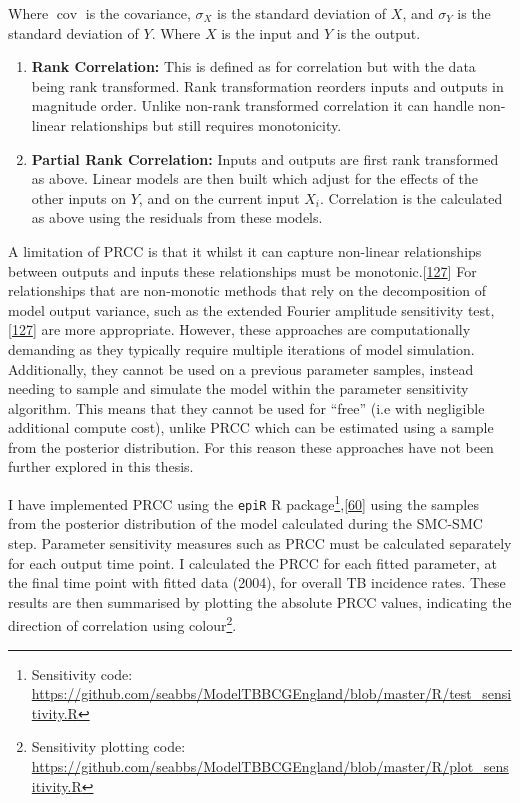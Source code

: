 \documentclass[11pt,twoside]{bristolthesis}
\begin{document}
  Where \(\operatorname {cov}\) is the covariance, \(\sigma _{X}\) is the standard deviation of \(X\), and \(\sigma_Y\) is the standard deviation of \(Y\). Where \(X\) is the input and \(Y\) is the output.
  \begin{enumerate}
  \def\labelenumi{\arabic{enumi}.}
  \setcounter{enumi}{1}
  \item
    \textbf{Rank Correlation:} This is defined as for correlation but with the data being rank transformed. Rank transformation reorders inputs and outputs in magnitude order. Unlike non-rank transformed correlation it can handle non-linear relationships but still requires monotonicity.
  \item
    \textbf{Partial Rank Correlation:} Inputs and outputs are first rank transformed as above. Linear models are then built which adjust for the effects of the other inputs on \(Y\), and on the current input \(X_i\). Correlation is the calculated as above using the residuals from these models.
  \end{enumerate}
  A limitation of PRCC is that it whilst it can capture non-linear relationships between outputs and inputs these relationships must be monotonic.{[}\protect\hyperlink{ref-Marino2009a}{127}{]} For relationships that are non-monotic methods that rely on the decomposition of model output variance, such as the extended Fourier amplitude sensitivity test,{[}\protect\hyperlink{ref-Marino2009a}{127}{]} are more appropriate. However, these approaches are computationally demanding as they typically require multiple iterations of model simulation. Additionally, they cannot be used on a previous parameter samples, instead needing to sample and simulate the model within the parameter sensitivity algorithm. This means that they cannot be used for ``free'' (i.e with negligible additional compute cost), unlike PRCC which can be estimated using a sample from the posterior distribution. For this reason these approaches have not been further explored in this thesis.
  
  I have implemented PRCC using the \texttt{epiR} R package\footnote{Sensitivity code: \url{https://github.com/seabbs/ModelTBBCGEngland/blob/master/R/test_sensitivity.R}},{[}\protect\hyperlink{ref-EpiR}{60}{]} using the samples from the posterior distribution of the model calculated during the SMC-SMC step. Parameter sensitivity measures such as PRCC must be calculated separately for each output time point. I calculated the PRCC for each fitted parameter, at the final time point with fitted data (2004), for overall TB incidence rates. These results are then summarised by plotting the absolute PRCC values, indicating the direction of correlation using colour\footnote{Sensitivity plotting code: \url{https://github.com/seabbs/ModelTBBCGEngland/blob/master/R/plot_sensitivity.R}}.
  
\end{document}
